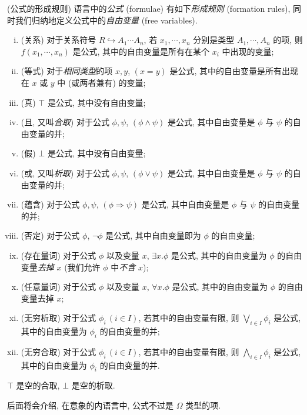 \begin{definition}
	[label={formula}]
	{(公式的形成规则)}
	语言中的\emph{公式} (formulae) 有如下\emph{形成规则} (formation rules), 同时我们归纳地定义公式中的\emph{自由变量} (free variables).
	\begin{enumerate}[(i)]
		\item (关系) 对于关系符号 $R \hookrightarrow A_1\cdots A_n$, 若 $x_1,\cdots,x_n$ 分别是类型 $A_1,\cdots,A_n$ 的项, 则 $f(x_1,\cdots,x_n)$ 是公式, 其中的自由变量是所有在某个 $x_i$ 中出现的变量;
		\item (等式) 对于\emph{相同类型}的项 $x,y$, $(x=y)$ 是公式, 其中的自由变量是所有出现在 $x$ 或 $y$ 中 (或两者兼有) 的变量;
		\item (真) $\top$ 是公式, 其中没有自由变量;
		\item (且, 又叫\emph{合取}) 对于公式 $\phi,\psi$, $(\phi\wedge\psi)$ 是公式, 其中自由变量是 $\phi$ 与 $\psi$ 的自由变量的并;
		\item (假) $\bot$ 是公式, 其中没有自由变量;
		\item (或, 又叫\emph{析取}) 对于公式 $\phi,\psi$, $(\phi\vee\psi)$ 是公式, 其中自由变量是 $\phi$ 与 $\psi$ 的自由变量的并;
		\item (蕴含) 对于公式 $\phi,\psi$, $(\phi\Rightarrow \psi)$ 是公式, 其中自由变量是 $\phi$ 与 $\psi$ 的自由变量的并;
		\item (否定) 对于公式 $\phi$, $\neg\phi$ 是公式, 其中自由变量即为 $\phi$ 的自由变量;
		\item (存在量词) 对于公式 $\phi$ 以及变量 $x$, $\exists x.\phi$ 是公式, 其中的自由变量为 $\phi$ 的自由变量\emph{去掉} $x$ (我们允许 $\phi$ 中\emph{不含} $x$);
		\item (任意量词) 对于公式 $\phi$ 以及变量 $x$, $\forall x.\phi$ 是公式, 其中的自由变量为 $\phi$ 的自由变量去掉 $x$;
		\item (无穷析取) 对于公式 $\phi_i\, (i\in I)$, 若其中的自由变量有限, 则 $\bigvee_{i\in I}\phi_i$ 是公式, 其中的自由变量为 $\phi_i$ 的自由变量的并;
		\item (无穷合取) 对于公式 $\phi_i\, (i\in I)$, 若其中的自由变量有限, 则 $\bigwedge_{i\in I}\phi_i$ 是公式, 其中的自由变量为 $\phi_i$ 的自由变量的并.
	\end{enumerate}
\end{definition}

\begin{remark}
	{}
	$\top$ 是空的合取, $\bot$ 是空的析取.
\end{remark}

\begin{remark}
	{}
	后面将会介绍, 在意象的内语言中, 公式不过是 $\Omega$ 类型的项.
\end{remark}

